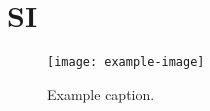 
\section{SI}

\lipsum[1]{}\citep{example}

\begin{figure}[htb]
    \centering
    \texttt{[image: example-image]}
    \caption{%
        Example caption.
    }\label{fig:caption-si}
\end{figure}

\lipsum[5]{}